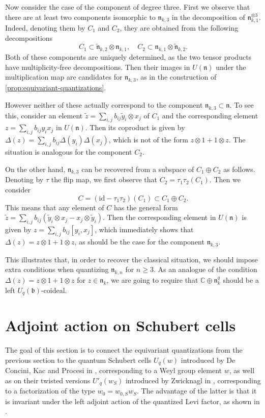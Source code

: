 \documentclass[a4paper, 12pt, reqno, english]{amsart}
\numberwithin{equation}{section}
\numberwithin{figure}{section}
\theoremstyle{plain}
\theoremstyle{plain}
\theoremstyle{plain}
\theoremstyle{plain}
\theoremstyle{plain}
\theoremstyle{definition}
\theoremstyle{definition}
\theoremstyle{definition}
\theoremstyle{remark}
\theoremstyle{definition}
\theoremstyle{definition}
\newcommand{\Uqb}{U_q(\mathfrak{b})}
\newcommand{\id}{\mathrm{id}}
\newcommand{\bbC}{\mathbb{C}}
\newcommand{\lien}{\mathfrak{n}}
\newcommand{\schub}{U_q}
\newcommand{\tschub}{U'_q}
\newcommand{\qnil}{\lien^q}
\begin{document}
Now consider the case of the component of degree three.
First we observe that there are at least two components isomorphic to $\lien_{k, 3}$ in the decomposition of $\lien_{k, 1}^{\otimes 3}$. Indeed, denoting them by $C_1$ and $C_2$, they are obtained from the following decompositions
\[
C_1 \subset \tilde{\lien}_{k, 2} \otimes \lien_{k, 1}, \quad
C_2 \subset \lien_{k, 1} \otimes \tilde{\lien}_{k, 2}.
\]
Both of these components are uniquely determined, as the two tensor products have multiplicity-free decompositions.
Then their images in $U(\lien)$ under the multiplication map are candidates for $\lien_{k, 3}$, as in the construction of \cref{prop:equivariant-quantizations}.

However neither of these actually correspond to the component $\lien_{k, 3} \subset \lien$.
To see this, consider an element $\tilde{z} = \sum_{i, j} b_{i j} \tilde{y}_i \otimes x_j$ of $C_1$ and the corresponding element $z = \sum_{i, j} b_{i j} y_i x_j$ in $U(\lien)$.
Then its coproduct is given by $\Delta(z) = \sum_{i, j} b_{i j} \Delta(y_i) \Delta(x_j)$, which is not of the form $z \otimes 1 + 1 \otimes z$. The situation is analogous for the component $C_2$.

On the other hand, $\lien_{k, 3}$ can be recovered from a subspace of $C_1 \oplus C_2$ as follows.
Denoting by $\tau$ the flip map, we first observe that $C_2 = \tau_1 \tau_2 (C_1)$. Then we consider
\[
C = (\id - \tau_1 \tau_2) (C_1) \subset C_1 \oplus C_2.
\]
This means that any element of $C$ has the general form $\tilde{z} = \sum_{i, j} b_{i j} (\tilde{y}_i \otimes x_j - x_j \otimes \tilde{y}_i)$.
Then the corresponding element in $U(\lien)$ is given by $z = \sum_{i, j} b_{i j} [y_i, x_j]$, which immediately shows that $\Delta(z) = z \otimes 1 + 1 \otimes z$, as should be the case for the component $\lien_{k, 3}$.

This illustrates that, in order to recover the classical situation, we should impose extra conditions when quantizing $\lien_{k, n}$ for $n \geq 3$.
As an analogue of the condition $\Delta(z) = z \otimes 1 + 1 \otimes z$ for $z \in \lien_k$, we are going to require that $\bbC \oplus \qnil_k$ should be a left $\Uqb$-coideal.

\section{Adjoint action on Schubert cells}
\label{sec:schubert-cells}

The goal of this section is to connect the equivariant quantizations from the previous section to the quantum Schubert cells $\schub(w)$ introduced by De Concini, Kac and Procesi in \cite{dckp}, corresponding to a Weyl group element $w$, as well as on their twisted versions $\tschub(w_S)$ introduced by Zwicknagl in \cite{zwicknagl}, corresponding to a factorization of the type $w_0 = w_{0, S} w_S$.
The advantage of the latter is that it is invariant under the left adjoint action of the quantized Levi factor, as shown in \cite[Theorem 5.21]{zwicknagl}.
\end{document}
